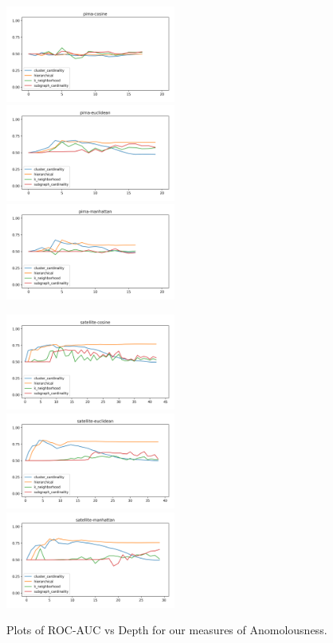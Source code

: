 \begin{figure}[!t]
\includegraphics[width=2.2in]{kdd/static/auc_vs_depth/pima-cosine.png}
\includegraphics[width=2.2in]{kdd/static/auc_vs_depth/pima-euclidean.png}
\includegraphics[width=2.2in]{kdd/static/auc_vs_depth/pima-manhattan.png}

\includegraphics[width=2.2in]{kdd/static/auc_vs_depth/satellite-cosine.png}
\includegraphics[width=2.2in]{kdd/static/auc_vs_depth/satellite-euclidean.png}
\includegraphics[width=2.2in]{kdd/static/auc_vs_depth/satellite-manhattan.png}

\caption{
Plots of ROC-AUC vs Depth for our measures of Anomolousness.
}

\label{results:datasets_2}
\end{figure}


